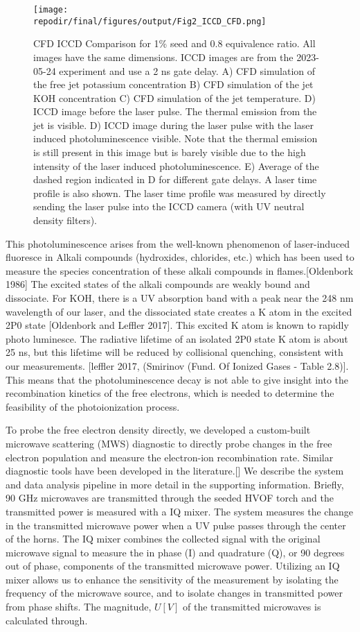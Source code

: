 \begin{figure}[h]
    \texttt{[image: \\repodir/final/figures/output/Fig2\_ICCD\_CFD.png]} 
    \caption{CFD ICCD Comparison for 1\% seed and 0.8 equivalence ratio. All images have the same dimensions. ICCD images are from the 2023-05-24 experiment and use a 2 ns gate delay. A) CFD simulation of the free jet potassium concentration B) CFD simulation of the jet KOH concentration C) CFD simulation of the jet temperature. D) ICCD image before the laser pulse. The thermal emission from the jet is visible. D) ICCD image during the laser pulse with the laser induced photoluminescence visible. Note that the thermal emission is still present in this image but is barely visible due to the high intensity of the laser induced photoluminescence. E) Average of the dashed region indicated in D for different gate delays. A laser time profile is also shown. The laser time profile was measured by directly sending the laser pulse into the ICCD camera (with UV neutral density filters). }
    \label{fig:ICCD_CFD}
\end{figure}

This photoluminescence arises from the well-known phenomenon of laser-induced fluoresce in Alkali compounds (hydroxides, chlorides, etc.) which has been used to measure the species concentration of these alkali compounds in flames.[Oldenbork 1986] The excited states of the alkali compounds are weakly bound and dissociate. For KOH, there is a UV absorption band with a peak near the 248 nm wavelength of our laser, and the dissociated state creates a K atom in the excited 2P0 state [Oldenbork and Leffler 2017]. This excited K atom is known to rapidly photo luminesce. The radiative lifetime of an isolated 2P0 state K atom is about 25 ns, but this lifetime will be reduced by collisional quenching, consistent with our measurements. [leffler 2017, (Smirinov (Fund. Of Ionized Gases - Table 2.8)]. This means that the photoluminescence decay is not able to give insight into the recombination kinetics of the free electrons, which is needed to determine the feasibility of the photoionization process.



To probe the free electron density directly, we developed a custom-built microwave scattering (MWS) diagnostic to directly probe changes in the free electron population and measure the electron-ion recombination rate. Similar diagnostic tools have been developed in the literature.[]  We describe the system and data analysis pipeline in more detail in the supporting information. Briefly, 90 GHz microwaves are transmitted through the seeded HVOF torch and the transmitted power is measured with a IQ mixer. The system measures the change in the transmitted microwave power when a UV pulse passes through the center of the horns.  The IQ mixer combines the collected signal with the original microwave signal to measure the in phase (I) and quadrature (Q), or 90 degrees out of phase, components of the transmitted microwave power. Utilizing an IQ mixer allows us to enhance the sensitivity of the measurement by isolating the frequency of the microwave source, and to isolate changes in transmitted power from phase shifts. The magnitude, $U [V]$ of the transmitted microwaves is calculated through.

